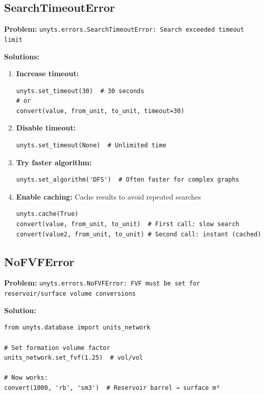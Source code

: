 \documentclass[11pt,a4paper]{report}
\begin{document}
\subsection{SearchTimeoutError}

\textbf{Problem:} \texttt{unyts.errors.SearchTimeoutError: Search exceeded timeout limit}

\textbf{Solutions:}

\begin{enumerate}
\item \textbf{Increase timeout:}
\begin{lstlisting}[style=pythonstyle]
unyts.set_timeout(30)  # 30 seconds
# or
convert(value, from_unit, to_unit, timeout=30)
\end{lstlisting}

\item \textbf{Disable timeout:}
\begin{lstlisting}[style=pythonstyle]
unyts.set_timeout(None)  # Unlimited time
\end{lstlisting}

\item \textbf{Try faster algorithm:}
\begin{lstlisting}[style=pythonstyle]
unyts.set_algorithm('DFS')  # Often faster for complex graphs
\end{lstlisting}

\item \textbf{Enable caching:} Cache results to avoid repeated searches
\begin{lstlisting}[style=pythonstyle]
unyts.cache(True)
convert(value, from_unit, to_unit)  # First call: slow search
convert(value2, from_unit, to_unit) # Second call: instant (cached)
\end{lstlisting}
\end{enumerate}

\subsection{NoFVFError}

\textbf{Problem:} \texttt{unyts.errors.NoFVFError: FVF must be set for reservoir/surface volume conversions}

\textbf{Solution:}
\begin{lstlisting}[style=pythonstyle]
from unyts.database import units_network

# Set formation volume factor
units_network.set_fvf(1.25)  # vol/vol

# Now works:
convert(1000, 'rb', 'sm3')  # Reservoir barrel → surface m³
\end{lstlisting}
\end{document}
